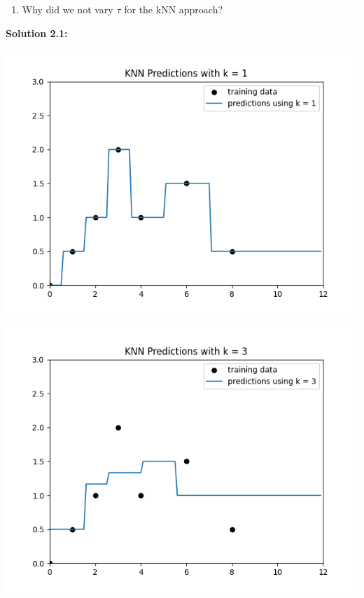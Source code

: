 \documentclass[submit]{harvardml}
\begin{document}
\begin{problem}
\begin{enumerate}
\item Why did we not vary $\tau$ for the kNN approach?

\end{enumerate}

\end{problem}

\newpage

\noindent\textbf{Solution 2.1:}\\
\begin{center}
    \includegraphics[scale=0.5]{k1.png}
\end{center}
\begin{center}
    \includegraphics[scale=0.5]{k3.png}
\end{center}
\end{document}

